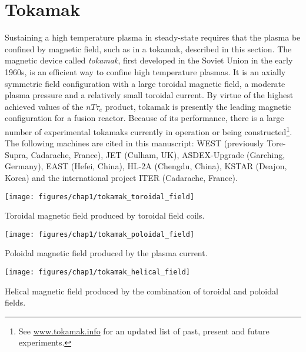 \section{Tokamak}
Sustaining a high temperature plasma in steady-state requires that the plasma be confined by magnetic field, such as in a tokamak, described in this section. The magnetic device called \emph{tokamak}, first developed in the Soviet Union in the early 1960s, is an efficient way to confine high temperature plasmas. It is an axially symmetric field configuration with a large toroidal magnetic field, a moderate plasma pressure and a relatively small toroidal current\cite{Freidberg2007}. By virtue of the highest achieved values of the $n T \tau_e$ product, tokamak is presently the leading magnetic configuration for a fusion reactor. Because of its performance, there is a large number of experimental tokamaks currently in operation or being constructed\footnote{See \href{http://www.tokamak.info/}{www.tokamak.info} for an updated list of past, present and future experiments.}. The following machines are cited in this manuscript: WEST (previously Tore-Supra, Cadarache, France), JET (Culham, UK), ASDEX-Upgrade (Garching, Germany), EAST (Hefei, China), HL-2A (Chengdu, China), KSTAR (Deajon, Korea) and the international project ITER (Cadarache, France).

\begin{marginfigure}[0cm]
	\texttt{[image: figures/chap1/tokamak\_toroidal\_field]}
	\caption{Toroidal magnetic field produced by toroidal field coils.}
	\label{fig:tokamak_toroidal_field}
\end{marginfigure}

\begin{marginfigure}[0cm]
	\texttt{[image: figures/chap1/tokamak\_poloidal\_field]}
	\caption{Poloidal magnetic field produced by the plasma current.}
	\label{fig:tokamak_poloidal_field}
\end{marginfigure}

\begin{marginfigure}[0cm]
	\texttt{[image: figures/chap1/tokamak\_helical\_field]}
	\caption{Helical magnetic field produced by the combination of toroidal and poloidal fields.}
	\label{fig:tokamak_helical_field}
\end{marginfigure}

